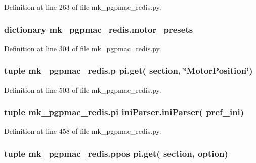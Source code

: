 Definition at line 263 of file mk\-\_\-pgpmac\-\_\-redis.\-py.

\hypertarget{namespacemk__pgpmac__redis_a2a04d8d0b7270384d1fac674c29e774a}{
\subsubsection[{motor\-\_\-presets}]{\setlength{\rightskip}{0pt plus 5cm}dictionary mk\-\_\-pgpmac\-\_\-redis.\-motor\-\_\-presets}}\label{namespacemk__pgpmac__redis_a2a04d8d0b7270384d1fac674c29e774a}


Definition at line 304 of file mk\-\_\-pgpmac\-\_\-redis.\-py.

\hypertarget{namespacemk__pgpmac__redis_a11daf2847f2dc94562b5b61b3f412574}{
\subsubsection[{p}]{\setlength{\rightskip}{0pt plus 5cm}tuple mk\-\_\-pgpmac\-\_\-redis.\-p pi.\-get( section, \char`\"{}Motor\-Position\char`\"{})}}\label{namespacemk__pgpmac__redis_a11daf2847f2dc94562b5b61b3f412574}


Definition at line 503 of file mk\-\_\-pgpmac\-\_\-redis.\-py.

\hypertarget{namespacemk__pgpmac__redis_a2f5bbda0250eecd94d166dc0a2fbff86}{
\subsubsection[{pi}]{\setlength{\rightskip}{0pt plus 5cm}tuple mk\-\_\-pgpmac\-\_\-redis.\-pi {\bf ini\-Parser.\-ini\-Parser}( {\bf pref\-\_\-ini})}}\label{namespacemk__pgpmac__redis_a2f5bbda0250eecd94d166dc0a2fbff86}


Definition at line 458 of file mk\-\_\-pgpmac\-\_\-redis.\-py.

\hypertarget{namespacemk__pgpmac__redis_aadd7321b8f7efe139c3e92e51cd34c00}{
\subsubsection[{ppos}]{\setlength{\rightskip}{0pt plus 5cm}tuple mk\-\_\-pgpmac\-\_\-redis.\-ppos pi.\-get( section, option)}}\label{namespacemk__pgpmac__redis_aadd7321b8f7efe139c3e92e51cd34c00}


